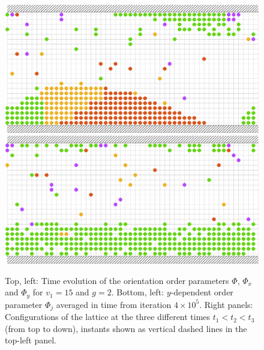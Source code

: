 \documentclass[aps,prl,twocolumn,amsmath,amssymb,superscriptaddress]{revtex4-1}
\begin{document}
\begin{figure}[h!]
\begin{minipage}{.24\textwidth}
    \includegraphics[width=\linewidth]{snap_g2_v1_15_t1.37e6}\\[4pt]
    \includegraphics[width=\linewidth]{snap_g2_v1_15_t1.6e6}
    \end{minipage}
    \caption{\label{fig:g2_v1_15}Top, left: Time evolution of the orientation order parameters $\Phi$, $\Phi_x$ and $\Phi_y$ for $v_1=15$ and $g=2$. Bottom, left: $y$-dependent order parameter $\Phi_j$ averaged in time from iteration $4\times10^5$. Right panels: Configurations of the lattice at the three different times $t_1<t_2<t_3$ (from top to down), instants shown as vertical dashed lines in the top-left panel.}
\end{figure}
\end{document}
